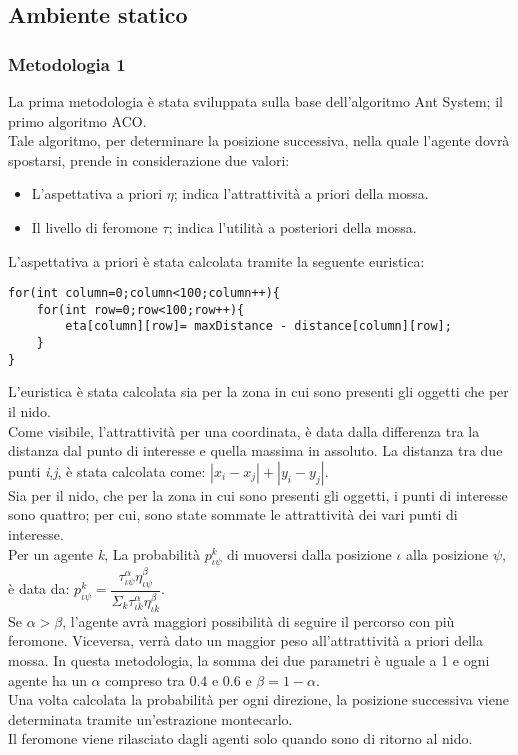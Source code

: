 \documentclass[12pt,a4paper,openright,twoside]{report}
\begin{document}
\subsection{Ambiente statico}

\subsubsection{Metodologia 1}

La prima metodologia è stata sviluppata sulla base dell'algoritmo Ant System; il primo algoritmo ACO.\\
Tale algoritmo, per determinare la posizione successiva, nella quale l'agente dovrà spostarsi, prende in considerazione due valori:

\begin{itemize}
	\item L'aspettativa a priori $\eta$; indica l'attrattività a priori della mossa.
	\item Il livello di feromone $\tau$; indica l'utilità a posteriori della mossa.
\end{itemize}

L'aspettativa a priori è stata calcolata tramite la seguente euristica: \\

\begin{verbatim}
for(int column=0;column<100;column++){
    for(int row=0;row<100;row++){
        eta[column][row]= maxDistance - distance[column][row];
    }
}
\end{verbatim}

L'euristica è stata calcolata sia per la zona in cui sono presenti gli oggetti che per il nido.\\
Come visibile, l'attrattività per una coordinata, è data dalla differenza tra la distanza dal punto di interesse e quella massima in assoluto. La distanza tra due punti \textit{i},\textit{j}, è stata calcolata come: $|x_i-x_j|+|y_i-y_j|$.\\
Sia per il nido, che per la zona in cui sono presenti gli oggetti, i punti di interesse sono quattro; per cui, sono state sommate le attrattività dei vari punti di interesse.\\
Per un agente \textit{k}, La probabilità $p^k_{\iota\psi}$  di muoversi dalla posizione $\iota$ alla posizione $\psi$, è data da: $p^k_{\iota\psi}= \dfrac{\tau^\alpha_{\iota\psi}\eta^\beta_{\iota\psi}}{\Sigma_k\tau^\alpha_{\iota k}\eta^\beta_{\iota k}}$. \\
Se $\alpha>\beta$, l'agente avrà maggiori possibilità di seguire il percorso con più feromone. Viceversa, verrà dato un maggior peso all'attrattività a priori della mossa. In questa metodologia, la somma dei due parametri è uguale a 1 e ogni agente ha un $\alpha$ compreso tra $0.4$ e $0.6$ e $\beta=1-\alpha$.\\
Una volta calcolata la probabilità per ogni direzione, la posizione successiva viene determinata tramite un'estrazione montecarlo.\\
Il feromone viene rilasciato dagli agenti solo quando sono di ritorno al nido.\\\\
\end{document}
